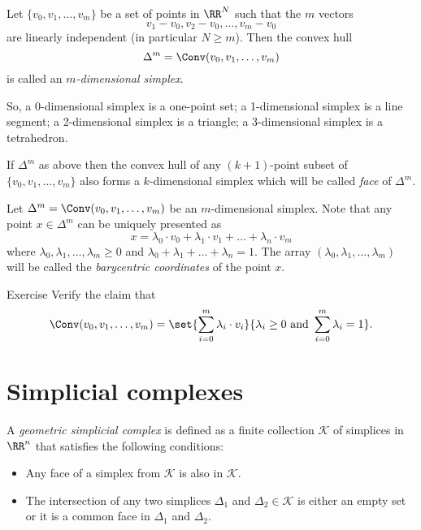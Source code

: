 Let $\{v_0,v_1,\dots,v_m\}$ be a set of points in $\RR^N$ 
such that the $m$ vectors 
$$v_1-v_0, v_2-v_0,\dots,v_m-v_0$$ 
are linearly independent (in particular $N\ge m$).
Then the convex hull 
$$\Delta^m=\Conv(v_0,v_1,\dots,v_m)$$
is called an \emph{$m$-dimensional simplex}.

So,
a 0-dimensional simplex is a one-point set; 
a 1-dimensional simplex is a line segment;
a 2-dimensional simplex is a triangle;
a 3-dimensional simplex is a tetrahedron.

If $\Delta^m$ as above
then the convex hull of any $(k+1)$-point subset of $\{v_0,v_1,\dots,v_m\}$ also forms a $k$-dimensional simplex which will be called \emph{face} of $\Delta^m$.


Let $\Delta^m=\Conv(v_0,v_1,\dots,v_m)$ be an $m$-dimensional simplex.
Note that any point $x\in \Delta^m$ can be uniquely presented as
$$x=\lambda_0\cdot v_0+\lambda_1\cdot v_1+\dots+\lambda_n\cdot v_m$$
where $\lambda_0,\lambda_1,\dots,\lambda_m\ge 0$ and
$\lambda_0+\lambda_1+\dots+\lambda_n=1$.
The array $(\lambda_0,\lambda_1,\dots,\lambda_m)$ will be called the \emph{barycentric coordinates} of the point $x$.

\begin{thm}{Exercise}\label{ex:convex-hull}
Verify the claim that $$\Conv(v_0,v_1,\dots,v_m) = \set{\sum_{i=0}^m \lambda_i \cdot v_i}{\lambda_i \ge 0 \textrm{ and } \sum_{i=0}^m \lambda_i = 1}.$$

\end{thm}




\section*{Simplicial complexes}

A \emph{geometric simplicial complex} is defined as a finite collection $\mathcal{K}$
of simplices in $\RR^n$ that satisfies the following conditions:
\begin{itemize}
\item Any face of a simplex from $\mathcal{K}$ is also in $\mathcal{K}$.
\item The intersection of any two simplices $\Delta_1$ and $\Delta_2\in \mathcal{K}$ is either an empty set or it 
is a common face in $\Delta_1$ and $\Delta_2$.
\end{itemize}

